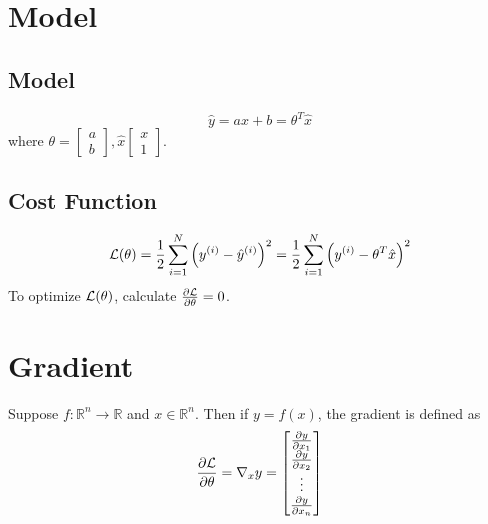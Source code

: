\documentclass{article}
\newcommand{\R}{\mathbb{R}}
\begin{document}
\section{Model}
\subsection{Model}
\[\hat{y} = ax + b = \theta^{T} \hat{x}\]
where $\theta = \begin{bmatrix} a \\ b \end{bmatrix}, \hat{x} \begin{bmatrix} x \\ 1 \end{bmatrix}$.
\subsection{Cost Function}
\[
    {\cal{L}} (\theta) 
    = \frac{1}{2} \sum^{N}_{i = 1} \left( y^{(i)} - \hat{y}^{(i)} \right)^2 
    = \frac{1}{2} \sum^{N}_{i = 1} \left( y^{(i)} - \theta^{T} \hat{x} \right)^2
\]
To optimize $\cal{L} (\theta)$, calculate $\frac{\partial {\cal{L}}}{\partial \theta} = 0$.
\section{Gradient}
Suppose $f : \R^n \to \R$ and $x \in \R^n$. Then if $y = f(x)$, the gradient is defined as
\[
    \frac{\partial {\cal{L}}}{\partial \theta} = \nabla_{x} y 
    = 
    \begin{bmatrix}
        \frac{\partial y}{\partial x_1} \\
        \frac{\partial y}{\partial x_2} \\
        \vdots \\
        \frac{\partial y}{\partial x_n} \\
    \end{bmatrix}
\]
\end{document}
